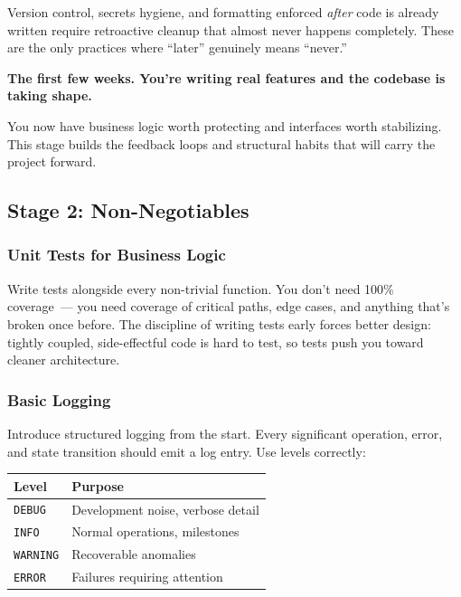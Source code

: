 Version control, secrets hygiene, and formatting enforced \emph{after} code is already written require retroactive cleanup that almost never happens completely. These are the only practices where ``later'' genuinely means ``never.''

\label{writing-good-code:stage-2--early-development}

\begin{notebox}

\textbf{The first few weeks. You're writing real features and the codebase is taking shape.}

\end{notebox}

\noindent{}You now have business logic worth protecting and interfaces worth stabilizing. This stage builds the feedback loops and structural habits that will carry the project forward.

\subsection*{Stage 2: Non-Negotiables}\label{writing-good-code:stage-2-non-negotiables}

\subsubsection*{Unit Tests for Business Logic}\label{writing-good-code:unit-tests-for-business-logic}

Write tests alongside every non-trivial function. You don't need 100\% coverage~--- you need coverage of critical paths, edge cases, and anything that's broken once before. The discipline of writing tests early forces better design: tightly coupled, side-effectful code is hard to test, so tests push you toward cleaner architecture.

\subsubsection*{Basic Logging}\label{writing-good-code:basic-logging}

Introduce structured logging from the start. Every significant operation, error, and state transition should emit a log entry. Use levels correctly:


{\def\LTcaptype{none} %
\begin{longtable}[]{@{}ll@{}}
\toprule\noalign{}
Level & Purpose \\
\midrule\noalign{}
\endhead
\bottomrule\noalign{}
\endlastfoot
\texttt{DEBUG} & Development noise, verbose detail \\
\texttt{INFO} & Normal operations, milestones \\
\texttt{WARNING} & Recoverable anomalies \\
\texttt{ERROR} & Failures requiring attention \\
\end{longtable}
}

